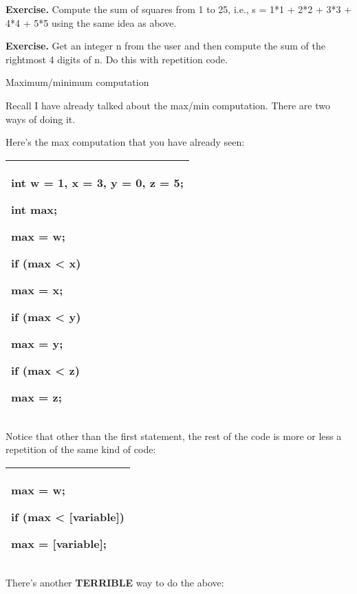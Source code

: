 \documentclass[
]{article}
\begin{document}
\textbf{Exercise.} Compute the sum of squares from 1 to 25, i.e., s =
1*1 + 2*2 + 3*3 + 4*4 + 5*5 using the same idea as above.

\textbf{Exercise.} Get an integer n from the user and then compute the
sum of the rightmost 4 digits of n. Do this with repetition code.

Maximum/minimum computation

Recall I have already talked about the max/min computation. There are
two ways of doing it.

Here's the max computation that you have already seen:

\begin{longtable}[]{@{}l@{}}
\toprule
\endhead
\begin{minipage}[t]{0.97\columnwidth}\raggedright
int w = 1, x = 3, y = 0, z = 5;

int max;

max = w;

if (max \textless{} x)

max = x;

if (max \textless{} y)

max = y;

if (max \textless{} z)

max = z;\strut
\end{minipage}\tabularnewline
\bottomrule
\end{longtable}

Notice that other than the first statement, the rest of the code is more
or less a repetition of the same kind of code:

\begin{longtable}[]{@{}l@{}}
\toprule
\endhead
\begin{minipage}[t]{0.97\columnwidth}\raggedright
max = w;

if (max \textless{} {[}variable{]})

max = {[}variable{]};\strut
\end{minipage}\tabularnewline
\bottomrule
\end{longtable}

There's another \textbf{TERRIBLE} way to do the above:
\end{document}
